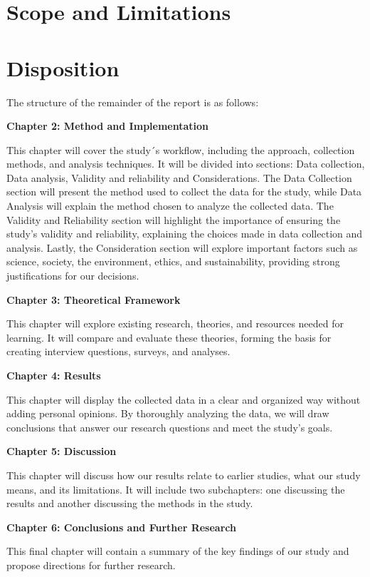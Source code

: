 \section{Scope and Limitations}

\section{Disposition}
The structure of the remainder of the report is as follows: 

\textbf{Chapter 2: Method and Implementation}

This chapter will cover the study´s workflow, including the approach, collection methods, and analysis techniques. It will be divided into sections: Data collection, Data analysis, Validity and reliability and Considerations. The Data Collection section will present the method used to collect the data for the study, while Data Analysis will explain the method chosen to analyze the collected data. The Validity and Reliability section will highlight the importance of ensuring the study’s validity and reliability, explaining the choices made in data collection and analysis. Lastly, the Consideration section will explore important factors such as science, society, the environment, ethics, and sustainability, providing strong justifications for our decisions.




\textbf{Chapter 3: Theoretical Framework} 

This chapter will explore existing research, theories, and resources needed for learning. It will compare and evaluate these theories, forming the basis for creating interview questions, surveys, and analyses.  

\textbf{Chapter 4: Results}

This chapter will display the collected data in a clear and organized way without adding personal opinions. By thoroughly analyzing the data, we will draw conclusions that answer our research questions and meet the study's goals.


\textbf{Chapter 5: Discussion}


This chapter will discuss how our results relate to earlier studies, what our study means, and its limitations. It will include two subchapters: one discussing the results and another discussing the methods in the study.  

 
\textbf{Chapter 6: Conclusions and Further Research}

This final chapter will contain a summary of the key findings of our study and propose directions for further research.  